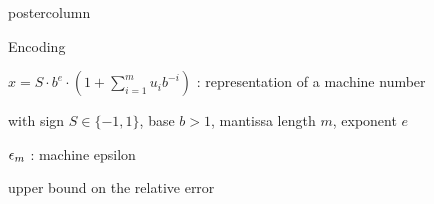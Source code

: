 \documentclass{beamer}
\begin{document}
\begin{frame}[fragile]{}
\begin{columns}
\begin{column}{.31\textwidth}
\begin{beamercolorbox}[center]{postercolumn}
\begin{minipage}{.98\textwidth}
{\begin{myblock}{Encoding}
						\hspace*{1ex}
						\begin{codebox}
						$x = S \cdot b^e \cdot \left(1 + \sum_{i = 1}^m u_ib^{-i}\right)$ : representation of a machine number
						\end{codebox}
						\hspace*{1ex} with sign $S \in \{-1, 1\}$, base $b > 1$, mantissa length $m$, exponent $e$  \\
						\hspace*{1ex}
						\begin{codebox}
							 $\epsilon_m$ : machine epsilon
						\end{codebox}
						\hspace*{1ex} upper bound on the relative error %
					\end{myblock}					
				}
			\end{minipage}
		\end{beamercolorbox}
	\end{column}
\end{columns}
\end{frame}

\newpage
\end{document}
